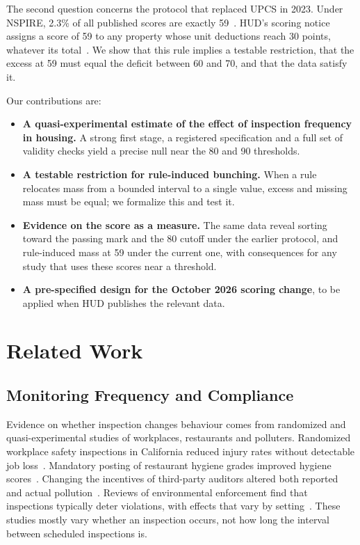 \documentclass[10pt,twocolumn,letterpaper]{article}
\begin{document}
The second question concerns the protocol that replaced UPCS in 2023. Under NSPIRE, 2.3\% of all published scores are exactly 59~\cite{ameen2026}. HUD's scoring notice assigns a score of 59 to any property whose unit deductions reach 30 points, whatever its total~\cite{nspirescoring}. We show that this rule implies a testable restriction, that the excess at 59 must equal the deficit between 60 and 70, and that the data satisfy it.

Our contributions are:
\begin{itemize}
\item \textbf{A quasi-experimental estimate of the effect of inspection frequency in housing.} A strong first stage, a registered specification and a full set of validity checks yield a precise null near the 80 and 90 thresholds.
\item \textbf{A testable restriction for rule-induced bunching.} When a rule relocates mass from a bounded interval to a single value, excess and missing mass must be equal; we formalize this and test it.
\item \textbf{Evidence on the score as a measure.} The same data reveal sorting toward the passing mark and the 80 cutoff under the earlier protocol, and rule-induced mass at 59 under the current one, with consequences for any study that uses these scores near a threshold.
\item \textbf{A pre-specified design for the October 2026 scoring change}, to be applied when HUD publishes the relevant data.
\end{itemize}

\section{Related Work}
\subsection{Monitoring Frequency and Compliance}
Evidence on whether inspection changes behaviour comes from randomized and quasi-experimental studies of workplaces, restaurants and polluters. Randomized workplace safety inspections in California reduced injury rates without detectable job loss~\cite{levine2012}. Mandatory posting of restaurant hygiene grades improved hygiene scores~\cite{jin2003}. Changing the incentives of third-party auditors altered both reported and actual pollution~\cite{duflo2013}. Reviews of environmental enforcement find that inspections typically deter violations, with effects that vary by setting~\cite{gray2011,shimshack2014}. These studies mostly vary whether an inspection occurs, not how long the interval between scheduled inspections is.
\end{document}
